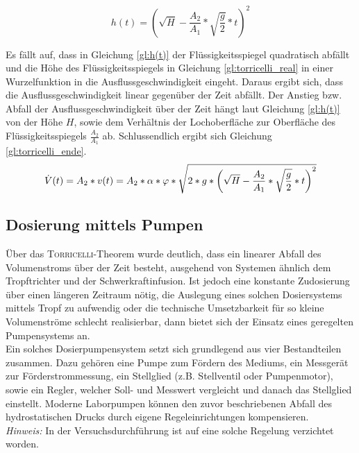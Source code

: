 \begin{equation}
	\label{gl:h(t)}
	h(t) = \left(\sqrt{H}-\frac{A_2}{A_1}*\sqrt{\frac{g}{2}}*t\right)^2
\end{equation}

Es fällt auf, dass in Gleichung \eqref{gl:h(t)} der Flüssigkeitsspiegel quadratisch abfällt und die Höhe des Flüssigkeitsspiegels in Gleichung \eqref{gl:torricelli_real} in einer Wurzelfunktion in die Ausflussgeschwindigkeit eingeht. Daraus ergibt sich, dass die Ausflussgeschwindigkeit linear gegenüber der Zeit abfällt. Der Anstieg bzw. Abfall der Ausflussgeschwindigkeit über der Zeit hängt laut Gleichung \eqref{gl:h(t)} von der Höhe $H$, sowie dem Verhältnis der Lochoberfläche zur Oberfläche des Flüssigkeitsspiegels $\frac{A_2}{A_1}$ ab. Schlussendlich ergibt sich Gleichung \eqref{gl:torricelli_ende}.
\begin{equation}
	\label{gl:torricelli_ende}
	\dot{V}(t) = A_2*v(t) =  A_2*\alpha*\varphi*\sqrt{2*g*\left(\sqrt{H}-\frac{A_2}{A_1}*\sqrt{\frac{g}{2}}*t\right)^2} \\
\end{equation}

\subsection{Dosierung mittels Pumpen}
Über das \textsc{Torricelli}-Theorem wurde deutlich, dass ein linearer Abfall des Volumenstroms über der Zeit besteht, ausgehend von Systemen ähnlich dem Tropftrichter und der Schwerkraftinfusion. Ist jedoch eine konstante Zudosierung über einen längeren Zeitraum nötig, die Auslegung eines solchen Dosiersystems mittels Tropf zu aufwendig oder die technische Umsetzbarkeit für so kleine Volumenströme schlecht realisierbar, dann bietet sich der Einsatz eines geregelten Pumpensystems an. \\
Ein solches Dosierpumpensystem setzt sich grundlegend aus vier Bestandteilen zusammen. Dazu gehören eine Pumpe zum Fördern des Mediums, ein Messgerät zur Förderstrommessung, ein Stellglied (z.B. Stellventil oder Pumpenmotor), sowie ein Regler, welcher Soll- und Messwert vergleicht und danach das Stellglied einstellt. \cite{Ignatowitz.2013}
\newpage
Moderne Laborpumpen können den zuvor beschriebenen Abfall des hydrostatischen Drucks durch eigene Regeleinrichtungen kompensieren. \cite{https:www.industr.com.16.06.2021}\\
\textit{Hinweis:} In der Versuchsdurchführung ist auf eine solche Regelung verzichtet worden.

